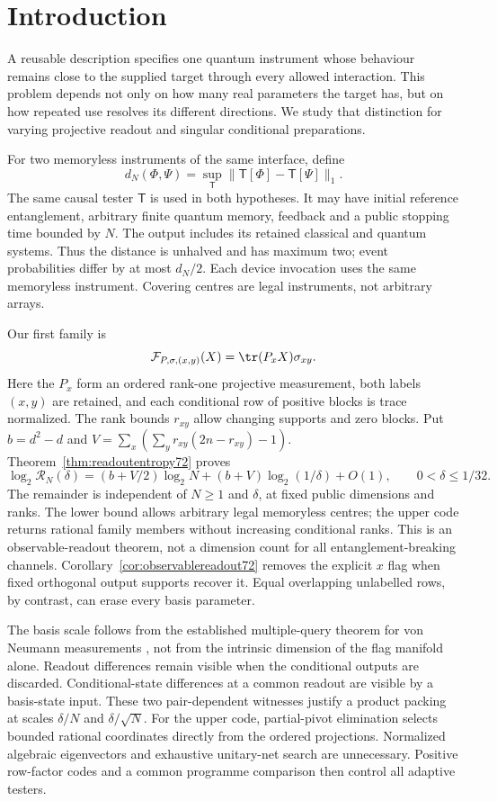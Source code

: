 \section{Introduction}
A reusable description specifies one quantum instrument whose behaviour
remains close to the supplied target through every allowed interaction.
This problem depends not only on how many real parameters the target
has, but on how repeated use resolves its different directions.
We study that distinction for varying projective readout and singular
conditional preparations.

For two memoryless instruments of the same interface, define
\[
 d_N(\Phi,\Psi)=\sup_{\mathsf T}
       \|\mathsf T[\Phi]-\mathsf T[\Psi]\|_1.
\]
The same causal tester $\mathsf T$ is used in both hypotheses. It may
have initial reference entanglement, arbitrary finite quantum memory,
feedback and a public stopping time bounded by $N$. The output includes
its retained classical and quantum systems. Thus the distance is
unhalved and has maximum two; event probabilities differ by at most
$d_N/2$. Each device invocation uses the same memoryless instrument.
Covering centres are legal instruments, not arbitrary arrays.

Our first family is
\[
 \mathcal F_{P,\sigma,(x,y)}(X)=\tr(P_xX)\sigma_{xy}.
\]
Here the $P_x$ form an ordered rank-one projective measurement, both
labels $(x,y)$ are retained, and each conditional row of positive
blocks is trace normalized. The rank bounds $r_{xy}$ allow changing
supports and zero blocks. Put $b=d^2-d$ and
$V=\sum_x(\sum_y r_{xy}(2n-r_{xy})-1)$.
Theorem~\ref{thm:readoutentropy72} proves
\[
 \log_2\mathcal R_N(\delta)
  =(b+V/2)\log_2N+(b+V)\log_2(1/\delta)+O(1),
 \qquad 0<\delta\le1/32.
\]
The remainder is independent of $N\ge1$ and $\delta$, at fixed
public dimensions and ranks. The lower bound allows arbitrary legal
memoryless centres; the upper code returns rational family members
without increasing conditional ranks. This is an observable-readout
theorem, not a dimension count for all entanglement-breaking channels.
Corollary~\ref{cor:observablereadout72} removes the explicit $x$ flag
when fixed orthogonal output supports recover it. Equal overlapping
unlabelled rows, by contrast, can erase every basis parameter.

The basis scale follows from the established multiple-query theorem
for von Neumann measurements \cite{PPKKO72}, not from the intrinsic
dimension of the flag manifold alone. Readout differences remain
visible when the conditional outputs are discarded. Conditional-state
differences at a common readout are visible by a basis-state input.
These two pair-dependent witnesses justify a product packing at scales
$\delta/N$ and $\delta/\sqrt N$. For the upper code, partial-pivot
elimination selects bounded rational coordinates directly from the
ordered projections. Normalized algebraic eigenvectors and exhaustive
unitary-net search are unnecessary. Positive row-factor codes and a
common programme comparison then control all adaptive testers.

